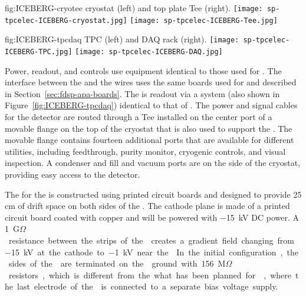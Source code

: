 \begin{dunefigure}
{fig:ICEBERG-cryotee}
{ cryostat (left) and top plate Tee (right).}
\texttt{[image: sp-tpcelec-ICEBERG-cryostat.jpg]}
\texttt{[image: sp-tpcelec-ICEBERG-Tee.jpg]}
\end{dunefigure}

\begin{dunefigure}
{fig:ICEBERG-tpcdaq}
{ TPC (left) and DAQ rack (right).}
\texttt{[image: sp-tpcelec-ICEBERG-TPC.jpg]}
\texttt{[image: sp-tpcelec-ICEBERG-DAQ.jpg]}
\end{dunefigure}

Power, readout, and controls use equipment identical to those used for . The
interface between the  and the  wires uses the same  boards
used for  and described in Section~\ref{sec:fdsp-apa-boards}. The  is
readout via a  system (also shown in Figure~\ref{fig:ICEBERG-tpcdaq})
identical to that of . The power and signal cables for the detector 
are routed through a Tee installed on the center port of a movable flange on the 
top of the cryostat that is also used to support the . The movable 
flange contains fourteen additional ports that are available for different utilities, 
including  feedthrough, purity monitor, cryogenic controls, and visual inspection. 
A condenser and  fill and vacuum ports are on the side of the cryostat, 
providing easy access to the detector.

The  for the  is constructed using printed circuit boards and 
designed to provide 25 cm of drift space on both sides of the . The cathode 
plane is made of a printed circuit board coated with copper and will be powered with 
\SI{-15}{kV} DC power. A \SI{1}{G$\Omega$} resistance between the strips of the 
creates a gradient field changing from \SI{-15}{kV} at the cathode to \SI{-1}{kV} near the 
. In the initial configuration, the sides of the  are terminated on the 
ground with \SI{156}{M$\Omega$} resistors, which is different from the what has been
planned for , where the last electrode of the  is connected to
a separate bias voltage supply. 

